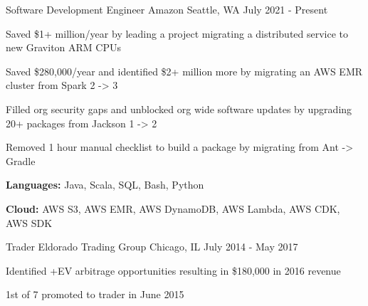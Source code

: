 

\begin{cventries}

  \cventry
    {Software Development Engineer} %
    {Amazon} %
    {Seattle, WA} %
    {July 2021 - Present} %
    {
      \begin{cvitems} %
        \item {Saved \$1+ million/year by leading a project migrating a distributed service to new Graviton ARM CPUs}
        \item {Saved \$280,000/year and identified \$2+ million more by migrating an AWS EMR cluster from Spark 2 -> 3}
        \item {Filled org security gaps and unblocked org wide software updates by upgrading 20+ packages from Jackson 1 -> 2}
        \item {Removed 1 hour manual checklist to build a package by migrating from Ant -> Gradle}
        \item {\textbf{Languages:} Java, Scala, SQL, Bash, Python}
        \item {\textbf{Cloud:} AWS S3, AWS EMR, AWS DynamoDB, AWS Lambda, AWS CDK, AWS SDK}
      \end{cvitems}
    }

  \cventry
    {Trader} %
    {Eldorado Trading Group} %
    {Chicago, IL} %
    {July 2014 - May 2017} %
    {
      \begin{cvitems} %
        \item {Identified +EV arbitrage opportunities resulting in \$180,000 in 2016 revenue}
        \item {1st of 7 promoted to trader in June 2015}
      \end{cvitems}
    }

\end{cventries}
